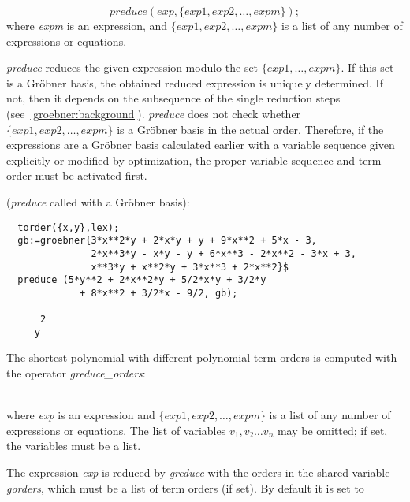 \hypertarget{operator:PREDUCE}{}
\[
 preduce(exp, \{exp1, exp2,\ldots , expm\});
\]
where \emph{expm} is an expression, and $\{exp1, exp2, \ldots ,
expm\}$ is a list of any number of expressions or equations.

\emph{preduce} reduces the given expression modulo the set $\{exp1,
\ldots , expm\}$. If this set is a Gr\"obner basis, the obtained reduced
expression is uniquely determined. If not, then it depends on the
subsequence of the single reduction steps
(see~\ref{groebner:background}). \emph{preduce} does not check whether
$\{exp1, exp2, \ldots , expm\}$ is a Gr\"obner basis in the actual
order. Therefore, if the expressions are a Gr\"obner basis calculated
earlier with a variable sequence given explicitly or modified by
optimization, the proper variable sequence and term order must
be activated first.

\example (\emph{preduce} called with a Gr\"obner basis):
\begin{verbatim}
  torder({x,y},lex);
  gb:=groebner{3*x**2*y + 2*x*y + y + 9*x**2 + 5*x - 3,
               2*x**3*y - x*y - y + 6*x**3 - 2*x**2 - 3*x + 3,
               x**3*y + x**2*y + 3*x**3 + 2*x**2}$
  preduce (5*y**2 + 2*x**2*y + 5/2*x*y + 3/2*y
             + 8*x**2 + 3/2*x - 9/2, gb);

      2
     y
\end{verbatim}

The shortest polynomial with different polynomial term orders is computed
with the operator \emph{greduce\_orders}:

\begin{description}
\item[{{\it greduce\_orders}($exp$, \{$exp1$, $exp2$, \ldots , $expm$\}
    [,\{$v_1,v_2,\ldots,v_n$\}]);}]\mbox{}\\
  \hypertarget{operator:GREDUCE_ORDERS}{}
where {\it exp} is an expression and $\{exp1, exp2,\ldots , expm\}$ is
a list of any number of expressions or equations. The list of variables
$v_1,v_2 \ldots v_n$ may be omitted; if set, the variables must be a list.
\end{description}

The expression {\it exp} is reduced by {\it greduce} with the orders
in the shared variable {\it gorders}, which must be a list of term
orders (if set). By default it is set to

